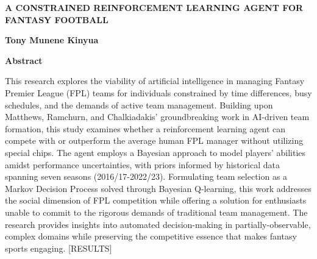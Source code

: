\thispagestyle{plain}
\begin{center}
    \Large
    \textbf{A CONSTRAINED REINFORCEMENT LEARNING AGENT FOR FANTASY FOOTBALL}
    
    \vspace{0.4cm}
    \large
    
    \vspace{0.4cm}
    \textbf{Tony Munene Kinyua}
    
    \vspace{0.9cm}
    \textbf{Abstract}
\end{center}

This research explores the viability of artificial intelligence in managing Fantasy Premier League (FPL) teams for individuals constrained by time differences, busy schedules, and the demands of active team management. Building upon Matthews, Ramchurn, and Chalkiadakis' groundbreaking work in AI-driven team formation, this study examines whether a reinforcement learning agent can compete with or outperform the average human FPL manager without utilizing special chips. The agent employs a Bayesian approach to model players' abilities amidst performance uncertainties, with priors informed by historical data spanning seven seasons (2016/17-2022/23). Formulating team selection as a Markov Decision Process solved through Bayesian Q-learning, this work addresses the social dimension of FPL competition while offering a solution for enthusiasts unable to commit to the rigorous demands of traditional team management. The research provides insights into automated decision-making in partially-observable, complex domains while preserving the competitive essence that makes fantasy sports engaging. [RESULTS]